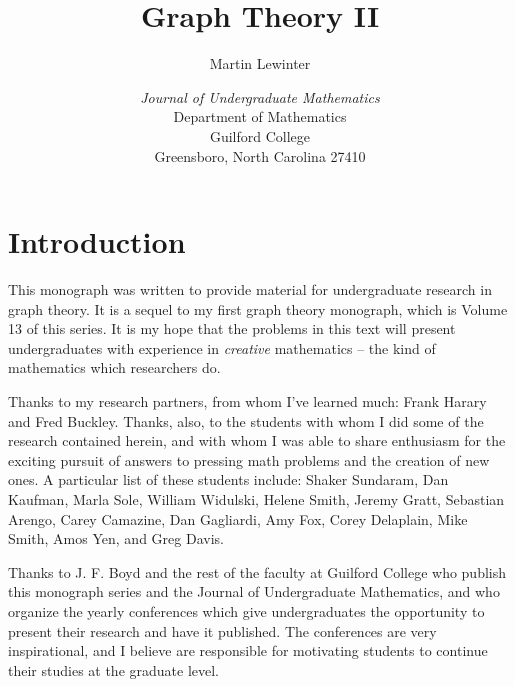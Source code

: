 \documentclass{article}
\let\titlepageAuthor\author
\renewcommand{\author}[1]{\newcommand{\headerAuthor}{#1}\titlepageAuthor{#1}}
\let\titlepageTitle\title
\renewcommand{\title}[1]{\newcommand{\headerTitle}{#1}\titlepageTitle{#1}}
\begin{document}
\title{Graph Theory II}
\author{Martin Lewinter}
\date{\vspace{3cm}
\emph{Journal of Undergraduate Mathematics}
  \\ Department of Mathematics
  \\ Guilford College
  \\ Greensboro, North Carolina 27410 
  }
\maketitle
\thispagestyle{empty}



\newpage

\setcounter{tocdepth}{3} 
\tableofcontents
\thispagestyle{empty}


\newpage


\section*{Introduction}


This monograph was written to provide material for undergraduate research in graph theory. It is a sequel to my first graph theory monograph, which is Volume 13 of this series. It is my hope that the problems in this text will present undergraduates with experience in \emph{creative} mathematics -- the kind of mathematics which researchers do.

Thanks to my research partners, from whom I've learned much: Frank Harary and Fred Buckley. Thanks, also, to the students with whom I did some of the research contained herein, and with whom I was able to share enthusiasm for the exciting pursuit of answers to pressing math problems and the creation of new ones. A particular list of these students include: Shaker Sundaram, Dan Kaufman, Marla Sole, William Widulski, Helene Smith, Jeremy Gratt, Sebastian Arengo, Carey Camazine, Dan Gagliardi, Amy Fox, Corey Delaplain, Mike Smith, Amos Yen, and Greg Davis.

Thanks to J. F. Boyd and the rest of the faculty at Guilford College who publish this monograph series and the Journal of Undergraduate Mathematics, and who organize the yearly conferences which give undergraduates the opportunity to present their research and have it published. The conferences are very inspirational, and I believe are responsible for motivating students to continue their studies at the graduate level.
\end{document}
